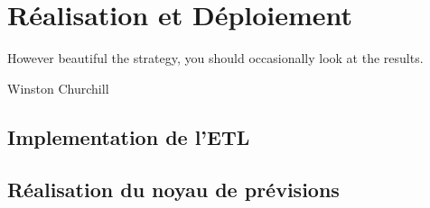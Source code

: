 \chapter{Réalisation et Déploiement}
\epigraph{However beautiful the strategy, you should occasionally look at the results.}{Winston Churchill}
\cleardoublepage
\cleardoublepage

	\section{Implementation de l'ETL}
	\section{Réalisation du noyau de prévisions}